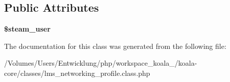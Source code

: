 \subsection*{Public Attributes}
\begin{DoxyCompactItemize}
\item 
\hypertarget{classlms__networking__profile_a9f4ebbc39707c868b31319bd5dbd9144}{
{\bfseries \$steam\_\-user}}
\label{classlms__networking__profile_a9f4ebbc39707c868b31319bd5dbd9144}

\end{DoxyCompactItemize}


The documentation for this class was generated from the following file:\begin{DoxyCompactItemize}
\item 
/Volumes/Users/Entwicklung/php/workspace\_\-koala\_/koala-\/core/classes/lms\_\-networking\_\-profile.class.php\end{DoxyCompactItemize}

